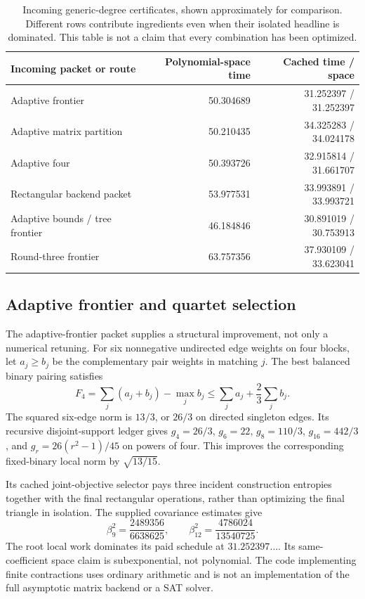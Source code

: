\documentclass[11pt,letterpaper]{article}
\theoremstyle{remark}\newtheorem{remark}[theorem]{Remark}
\begin{document}
\begin{table}[htbp]\centering\small
\begin{tabular}{@{}p{}rr@{}}\toprule
Incoming packet or route & Polynomial-space time & Cached time / space\\\midrule
Adaptive frontier &50.304689&31.252397 / 31.252397\\
Adaptive matrix partition &50.210435&34.325283 / 34.024178\\
Adaptive four &50.393726&32.915814 / 31.661707\\
Rectangular backend packet &53.977531&33.993891 / 33.993721\\
Adaptive bounds / tree frontier &46.184846&30.891019 / 30.753913\\
Round-three frontier &63.757356&37.930109 / 33.623041\\\bottomrule
\end{tabular}
\caption{Incoming generic-degree certificates, shown approximately for comparison. Different rows contribute ingredients even when their isolated headline is dominated. This table is not a claim that every combination has been optimized.}
\end{table}

\subsection{Adaptive frontier and quartet selection}
The adaptive-frontier packet supplies a structural improvement, not only a numerical retuning. For six nonnegative undirected edge weights on four blocks, let $a_j\ge b_j$ be the complementary pair weights in matching $j$. The best balanced binary pairing satisfies
\[
 F_4=\sum_j(a_j+b_j)-\max_jb_j
 \le\sum_ja_j+\frac23\sum_jb_j.
\]
The squared six-edge norm is $13/3$, or $26/3$ on directed singleton edges. Its recursive disjoint-support ledger gives $g_4=26/3$, $g_6=22$, $g_8=110/3$, $g_{16}=442/3$, and $g_r=26(r^2-1)/45$ on powers of four. This improves the corresponding fixed-binary local norm by $\sqrt{13/15}$.

Its cached joint-objective selector pays three incident construction entropies together with the final rectangular operations, rather than optimizing the final triangle in isolation. The supplied covariance estimates give
\[
 \beta_9^2=\frac{2489356}{6638625},\qquad
 \beta_{12}^2=\frac{4786024}{13540725}.
\]
The root local work dominates its paid schedule at $31.252397\ldots$. Its same-coefficient space claim is subexponential, not polynomial. The code implementing finite contractions uses ordinary arithmetic and is not an implementation of the full asymptotic matrix backend or a SAT solver.
\end{document}
